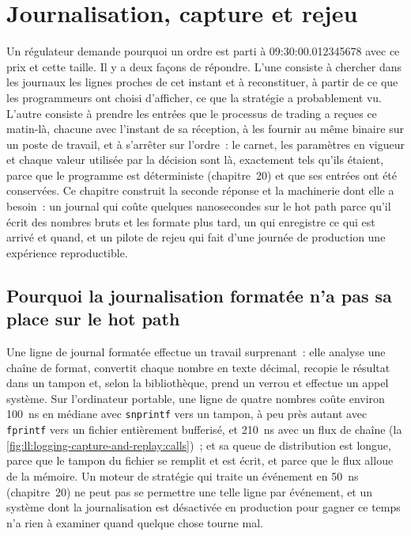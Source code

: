 \chapter{Journalisation, capture et rejeu}\label{ch:ll:logging-capture-and-replay}

Un régulateur demande pourquoi un ordre est parti à 09:30:00.012345678 avec ce prix et cette taille. Il y a deux façons de répondre. L'une
consiste à chercher dans les journaux les lignes proches de cet instant et à reconstituer, à partir de ce que les programmeurs ont choisi d'afficher, ce que la stratégie
a probablement vu. L'autre consiste à prendre les entrées que le processus de trading a reçues ce matin-là, chacune avec l'instant de sa réception,
à les fournir au même binaire sur un poste de travail, et à s'arrêter sur l'ordre~: le carnet, les paramètres en vigueur et chaque valeur utilisée par la
décision sont là, exactement tels qu'ils étaient, parce que le programme est déterministe (chapitre~20) et que ses entrées ont été conservées.
Ce chapitre construit la seconde réponse et la machinerie dont elle a besoin~: un journal qui coûte quelques nanosecondes sur le hot path parce
qu'il écrit des nombres bruts et les formate plus tard, un  qui enregistre ce qui est arrivé et quand, et un pilote de rejeu qui
fait d'une journée de production une expérience reproductible.

\section{Pourquoi la journalisation formatée n'a pas sa place sur le hot path}

Une ligne de journal formatée effectue un travail surprenant~: elle analyse une chaîne de format, convertit chaque nombre en texte décimal,
recopie le résultat dans un tampon et, selon la bibliothèque, prend un verrou et effectue un appel système. Sur l'ordinateur portable, une ligne
de quatre nombres coûte environ \qty{100}{\nano\second} en médiane avec \texttt{snprintf} vers un tampon, à peu près autant
avec \texttt{fprintf} vers un fichier entièrement bufferisé, et \qty{210}{\nano\second} avec un flux de chaîne
(la \cref{fig:ll:logging-capture-and-replay:calls})~; et sa queue de distribution est longue, parce que le tampon du fichier se remplit et est écrit, et
parce que le flux alloue de la mémoire. Un moteur de stratégie qui traite un événement en \qty{50}{\nano\second} (chapitre~20) ne peut pas se permettre une
telle ligne par événement, et un système dont la journalisation est désactivée en production pour gagner ce temps n'a rien à examiner quand
quelque chose tourne mal.

